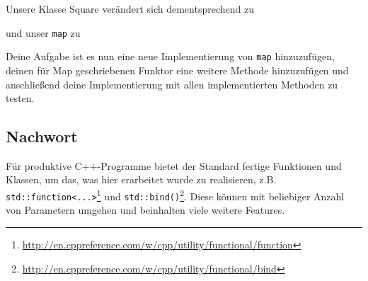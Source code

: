 Unsere Klasse Square verändert sich dementsprechend zu



und unser \lstinline{map} zu 



Deine Aufgabe ist es nun eine neue Implementierung von \lstinline{map} hinzuzufügen, deinen für Map geschriebenen Funktor eine weitere Methode hinzuzufügen und anschließend deine Implementierung mit allen implementierten Methoden zu testen.

\subsection*{Nachwort}
Für produktive C++-Programme bietet der Standard fertige Funktionen und Klassen, um das, was hier erarbeitet wurde zu realisieren, z.B. \lstinline{std::function<...>}\footnote{\url{http://en.cppreference.com/w/cpp/utility/functional/function}} und \lstinline{std::bind()}\footnote{\url{http://en.cppreference.com/w/cpp/utility/functional/bind}}.
Diese können mit beliebiger Anzahl von Parametern umgehen und beinhalten viele weitere Features.
